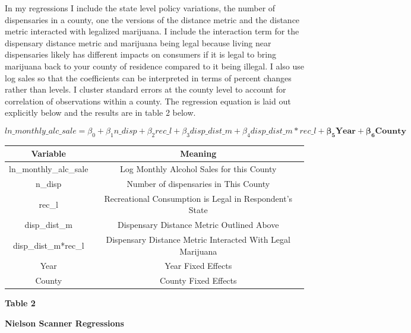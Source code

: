 \documentclass[11pt]{article}
\begin{document}
In my regressions I include the state level policy variations, the number of dispensaries in a county, one the versions of the distance metric and the distance metric interacted with legalized marijuana. I include the interaction term for the dispensary distance metric and marijuana being legal because living near dispensaries likely has different impacts on consumers if it is legal to bring marijuana back to your county of residence compared to it being illegal. I also use log sales so that the coefficients can be interpreted in terms of percent changes rather than levels. I cluster standard errors at the county level to account for correlation of observations within a county. The regression equation is laid out explicitly below and the results are in table 2 below. 

$$
ln\_monthly\_alc\_sale = \beta_0 +  \beta_1  n\_disp  + \beta_2 rec\_l + \beta_3 disp\_dist\_m + \beta_4 disp\_dist\_m*rec\_l + \bm{\beta_5 Year} + \bm{\beta_6 County}$$

\begin{center}
	\begin{tabular}{||c | c||} 
		\hline
		Variable & Meaning  \\ [0.5ex] 
		\hline\hline
		ln\_monthly\_alc\_sale & Log Monthly Alcohol Sales for this County \\ 
		\hline 
		n\_disp & Number of dispensaries in This County  \\ 
		\hline
		rec\_l & Recreational Consumption is Legal in Respondent's State  \\ 
		\hline
		disp\_dist\_m & Dispensary Distance Metric Outlined Above \\
		\hline
		disp\_dist\_m*rec\_l & Dispensary Distance Metric Interacted With Legal Marijuana\\
		\hline
		Year & Year Fixed Effects \\
		\hline
		County & County Fixed Effects\\[1ex] 
		\hline
	\end{tabular}
\end{center}


\begin{center}
	
	\centering
	\LARGE{\textbf{Table 2}}\par\medskip
	
	\normalsize{\textbf{Nielson Scanner Regressions}}\par\medskip
	\scalebox{.8}{
		
	}
\end{center}
\end{document}
